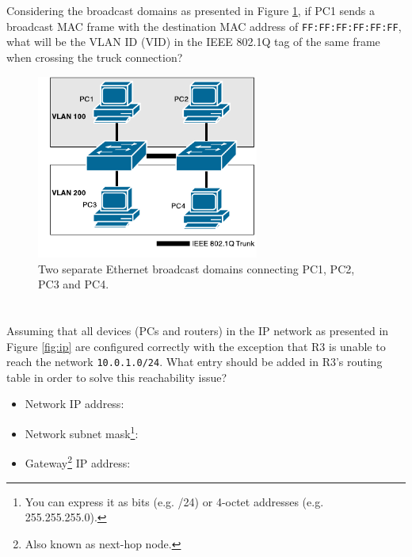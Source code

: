 \documentclass[pdftex,12pt,a4paper]{article}
\begin{document}
    \section{}
        Considering the broadcast domains as presented in Figure
        \ref{fig:vlan}, if PC1 sends a broadcast MAC frame with the destination
        MAC address of \texttt{FF:FF:FF:FF:FF:FF}, what will be the VLAN ID
        (VID) in the IEEE 802.1Q tag of the same frame when crossing the truck
        connection?
        \begin{figure}[tbh]
            \centering
            \includegraphics[width=0.65\textwidth]{figures/diag2.pdf}
            \caption{Two separate Ethernet broadcast domains connecting PC1,
            PC2, PC3 and PC4.}
            \label{fig:vlan}
        \end{figure}

        \newpage

    \section{}
        Assuming that all devices (PCs and routers) in the IP network as
        presented in Figure \ref{fig:ip} are configured correctly with the
        exception that R3 is unable to reach the network \texttt{10.0.1.0/24}.
        What entry should be added in R3's routing table in order to solve this
        reachability issue?
        \begin{itemize}
            \item Network IP address:
            \item Network subnet mask\footnote{You can express it as bits (e.g.
                /24) or 4-octet addresses (e.g. 255.255.255.0).}:
            \item Gateway\footnote{Also known as next-hop node.} IP address:
        \end{itemize}
\end{document}
